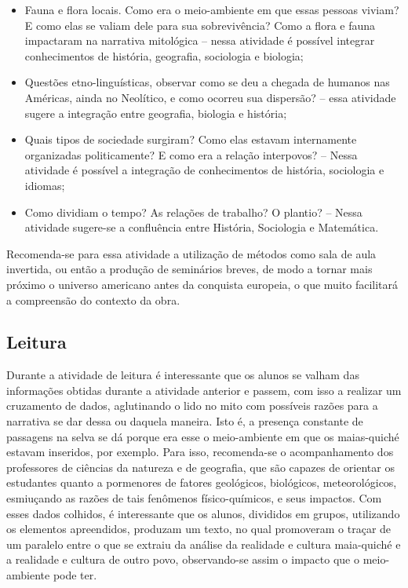 \documentclass[12pt]{extarticle}
\begin{document}
\begin{itemize}
\item
  Fauna e flora locais. Como era o meio-ambiente em que essas pessoas
  viviam? E como elas se valiam dele para sua sobrevivência? Como a
  flora e fauna impactaram na narrativa mitológica -- nessa atividade é
  possível integrar conhecimentos de história, geografia, sociologia e
  biologia;
\item
  Questões etno-linguísticas, observar como se deu a chegada de humanos
  nas Américas, ainda no Neolítico, e como ocorreu sua dispersão? --
  essa atividade sugere a integração entre geografia, biologia e
  história;
\item
  Quais tipos de sociedade surgiram? Como elas estavam internamente
  organizadas politicamente? E como era a relação interpovos? -- Nessa
  atividade é possível a integração de conhecimentos de história,
  sociologia e idiomas;
\item
  Como dividiam o tempo? As relações de trabalho? O plantio? -- Nessa
  atividade sugere-se a confluência entre História, Sociologia e
  Matemática.
\end{itemize}

Recomenda-se para essa atividade a utilização de métodos como sala de
aula invertida, ou então a produção de seminários breves, de modo a
tornar mais próximo o universo americano antes da conquista europeia, o
que muito facilitará a compreensão do contexto da obra.

\subsection{Leitura}

Durante a atividade de leitura é interessante que os alunos
se valham das informações obtidas durante a atividade anterior e passem,
com isso a realizar um cruzamento de dados, aglutinando o lido no mito
com possíveis razões para a narrativa se dar dessa ou daquela maneira.
Isto é, a presença constante de passagens na selva se dá porque era esse
o meio-ambiente em que os maias-quiché estavam inseridos, por exemplo.
Para isso, recomenda-se o acompanhamento dos professores de ciências da
natureza e de geografia, que são capazes de orientar os estudantes
quanto a pormenores de fatores geológicos, biológicos, meteorológicos,
esmiuçando as razões de tais fenômenos físico-químicos, e seus impactos.
Com esses dados colhidos, é interessante que os alunos, divididos em
grupos, utilizando os elementos apreendidos, produzam um texto, no qual
promoveram o traçar de um paralelo entre o que se extraiu da análise da
realidade e cultura maia-quiché e a realidade e cultura de outro povo,
observando-se assim o impacto que o meio-ambiente pode ter.
\end{document}
